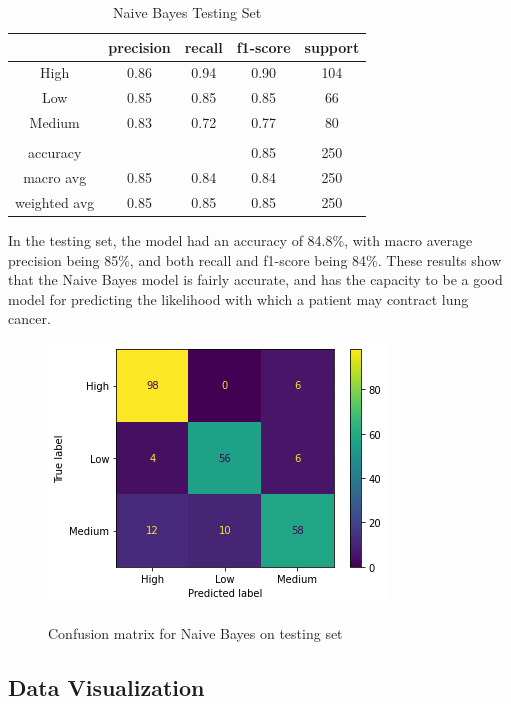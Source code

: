 \documentclass[runningheads]{llncs}
\begin{document}
\begin{table}[ht]
\centering
\caption{Naive Bayes Testing Set} \vspace{0.25em}
\begin{tabular}{|c|c|c|c|c|} \hline
 & precision & recall & f1-score & support \\ \hline
High   & 0.86 & 0.94 & 0.90 & 104 \\ \hline
Low    & 0.85 & 0.85 & 0.85 & 66 \\ \hline
Medium & 0.83 & 0.72 & 0.77 & 80 \\ \hline
& & & & \\ \hline
accuracy     & & & 0.85 & 250 \\ \hline
macro avg    & 0.85 & 0.84 & 0.84 & 250 \\ \hline
weighted avg & 0.85 & 0.85 & 0.85 & 250 \\ \hline
\end{tabular}
\label{tab:naivebayes-testing}
\end{table}

In the testing set, the model had an accuracy of 84.8\%, with macro average precision being 85\%, and both recall and f1-score being 84\%. These results show that the Naive Bayes model is fairly accurate, and has the capacity to be a good model for predicting the likelihood with which a patient may contract lung cancer.

\begin{figure}[ht]           	 
\centering               	 
\caption{Confusion matrix for Naive Bayes on testing set}
\includegraphics[scale=0.5]{naivebayes-CM-testing.png}  	 
\label{fig:naivebayes-CM-testing}
\end{figure}
\newpage

\subsection{Data Visualization}
\end{document}
